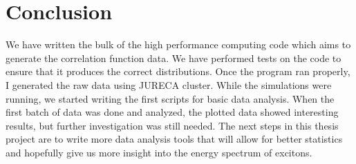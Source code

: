 
\chapter{Conclusion}
\label{sec:conclusion}


We have written the bulk of the high performance computing code which aims to generate the correlation function data. We have performed tests on the code to ensure that it produces the correct distributions. Once the program ran properly, I generated the raw data using JURECA cluster. While the simulations were running, we started writing the first scripts for basic data analysis. When the first batch of data was done and analyzed, the plotted data showed interesting results, but further investigation was still needed.
The next steps in this thesis project are to write more data analysis tools that will allow for better statistics and hopefully give us more insight into the energy spectrum of excitons.